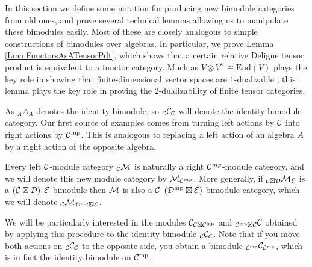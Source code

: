 \documentclass{amsart}
\begin{document}
In this section we define some notation for producing new bimodule categories from old ones, and prove several technical lemmas allowing us to manipulate these bimodules easily.  Most of these are closely analogous to simple constructions of bimodules over algebras.  In particular, we prove Lemma \ref{Lma:FunctorsAsATensorPdt}, which shows that a certain relative Deligne tensor product is equivalent to a functor category.  Much as $V \otimes V^\vee \cong \mathrm{End}(V)$ plays the key role in showing that finite-dimensional vector spaces are $1$-dualizable \cite[Ex. 1.1.9]{lurie-ch}, this lemma plays the key role in proving the $2$-dualizability of finite tensor categories.

As ${}_A A_A$ denotes the identity bimodule, so ${}_\mathcal C \mathcal C_{\mathcal C}$ will denote the identity bimodule category.  Our first source of examples comes from turning left actions by $\mathcal C$ into right actions by $\mathcal C^{\mathrm{mp}}$.  This is analogous to replacing a left action of an algebra $A$ by a right action of the opposite algebra.

\begin{definition}
Every left $\mathcal C$-module category ${}_\mathcal C \mathcal M$ is naturally a right $\mathcal C^{mp}$-module category, and we will denote this new module category by $\mathcal M_{\mathcal C^{mp}}$.  More generally, if ${}_{\mathcal C \boxtimes \mathcal D} \mathcal M_{\mathcal E}$ is a $(\mathcal C \boxtimes \mathcal D)$-$\mathcal E$ bimodule then $\mathcal M$ is also a $\mathcal C$-$(\mathcal D^{\mathrm{mp}} \boxtimes \mathcal E)$ bimodule category, which we will denote ${}_{\mathcal C}\mathcal M_{\mathcal D^{\mathrm{mp}} \boxtimes \mathcal E}$.
\end{definition}

We will be particularly interested in the modules $\mathcal C_{\mathcal C \boxtimes \mathcal C^{\mathrm{mp}}}$ and ${}_{\mathcal C^{\mathrm{mp}} \boxtimes \mathcal C} \mathcal C$ obtained by applying this procedure to the identity bimodule ${}_\mathcal C \mathcal C_\mathcal C$.  Note that if you move both actions on ${}_\mathcal C \mathcal C_\mathcal C$ to the opposite side, you obtain a bimodule ${}_{\mathcal C^{\mathrm{mp}}}\mathcal C_{\mathcal C^{\mathrm{mp}}}$, which is in fact the identity bimodule on $\mathcal C^{\mathrm{mp}}$.
\end{document}
